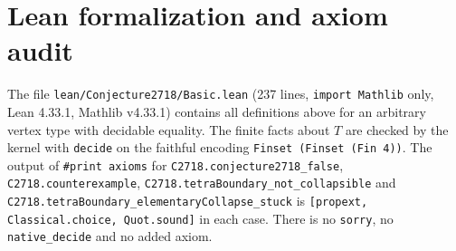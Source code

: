 \documentclass[11pt]{article}
\theoremstyle{definition}
\begin{document}
\section{Lean formalization and axiom audit}

The file \texttt{lean/Conjecture2718/Basic.lean} (237 lines, \texttt{import Mathlib} only, Lean
4.33.1, Mathlib v4.33.1) contains all definitions above for an arbitrary vertex type with decidable
equality. The finite facts about $T$ are checked by the kernel with \texttt{decide} on the faithful
encoding \texttt{Finset (Finset (Fin 4))}. The output of \texttt{\#print axioms} for
\texttt{C2718.conjecture2718\_false}, \texttt{C2718.counterexample},
\texttt{C2718.tetraBoundary\_not\_collapsible} and
\texttt{C2718.tetraBoundary\_elementaryCollapse\_stuck} is
\texttt{[propext, Classical.choice, Quot.sound]} in each case. There is no \texttt{sorry}, no
\texttt{native\_decide} and no added axiom.
\end{document}
